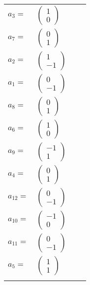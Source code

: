 \documentclass[1p]{elsarticle_modified}
\theoremstyle{definition}
\begin{document}
\begin{tabular}{m{7pt} m{180pt} m{7pt} m{180pt} }
\flushright $a_{3}=$&$\begin{pmatrix}1\\0\end{pmatrix}$ \\
\flushright $a_{7}=$&$\begin{pmatrix}0\\1\end{pmatrix}$ \\
\flushright $a_{2}=$&$\begin{pmatrix}1\\-1\end{pmatrix}$ \\
\flushright $a_{1}=$&$\begin{pmatrix}0\\-1\end{pmatrix}$ \\
\flushright $a_{8}=$&$\begin{pmatrix}0\\1\end{pmatrix}$ \\
\flushright $a_{6}=$&$\begin{pmatrix}1\\0\end{pmatrix}$ \\
\flushright $a_{9}=$&$\begin{pmatrix}-1\\1\end{pmatrix}$ \\
\flushright $a_{4}=$&$\begin{pmatrix}0\\1\end{pmatrix}$ \\
\flushright $a_{12}=$&$\begin{pmatrix}0\\-1\end{pmatrix}$ \\
\flushright $a_{10}=$&$\begin{pmatrix}-1\\0\end{pmatrix}$ \\
\flushright $a_{11}=$&$\begin{pmatrix}0\\-1\end{pmatrix}$ \\
\flushright $a_{5}=$&$\begin{pmatrix}1\\1\end{pmatrix}$\\&\end{tabular}
\end{document}
